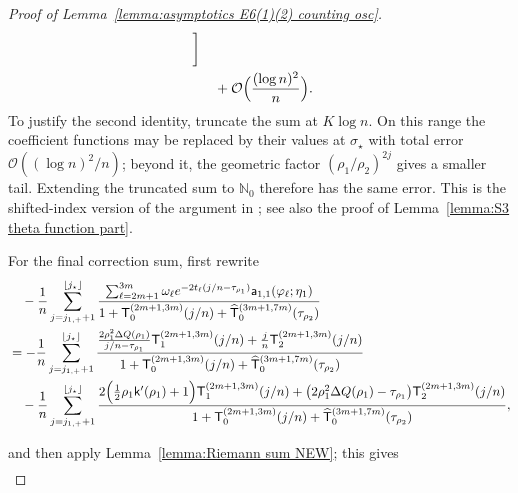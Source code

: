 \documentclass[a4paper]{article}
\numberwithin{equation}{section}
\begin{document}
\begin{proof}[Proof of Lemma~\ref{lemma:asymptotics E6(1)(2) counting osc}]
\begin{align*}
\bigg]
\\
&\quad 
+\mathcal{O}\Bigl(\frac{(\log n)^2}{n}\Bigr). 
\end{align*}
To justify the second identity, truncate the sum at $K\log n$.  On this range
the coefficient functions may be replaced by their values at $\sigma_\star$
with total error $\mathcal O((\log n)^2/n)$; beyond it, the geometric factor
$(\rho_1/\rho_2)^{2j}$ gives a smaller tail.  Extending the truncated sum to
$\mathbb N_0$ therefore has the same error.  This is the shifted-index version
of the argument in \cite{ACCL2}; see also the proof of
Lemma~\ref{lemma:S3 theta function part}.

For the final correction sum, first rewrite
\begin{align*}
&\quad 
-\frac{1}{n}
\sum_{j=j_{1,+}+1}^{\lfloor j_{\star}\rfloor}
\frac{
\sum_{\ell={2m+1}}^{3m}\omega_{\ell}
e^{-2t_{\ell}(j/n-\tau_{\rho_1})}
\mathsf{a}_{1,1}(\varphi_{\ell};\eta_1)
}{
1+\mathsf{T}_{0}^{(2m+1,3m)}(j/n)+\widehat{\mathsf{T}}_0^{(3m+1,7m)}(\tau_{\rho_2})}
\\
&=
-\frac{1}{n}
\sum_{j=j_{1,+}+1}^{\lfloor j_{\star}\rfloor}
\frac{\frac{2\rho_1^2\Delta Q(\rho_1)}{j/n-\tau_{\rho_1}}
\mathsf{T}_{1}^{(2m+1,3m)}(j/n)
+
\frac{j}{n}
\mathsf{T}_{2}^{(2m+1,3m)}(j/n)
}{
1+\mathsf{T}_{0}^{(2m+1,3m)}(j/n)+\widehat{\mathsf{T}}_0^{(3m+1,7m)}(\tau_{\rho_2})}
\\
&\quad 
-\frac{1}{n}
\sum_{j=j_{1,+}+1}^{\lfloor j_{\star}\rfloor}
\frac{2\Bigl(\frac{1}{2}\rho_1\mathsf{k}'(\rho_1)+1\Bigr)
\mathsf{T}_{1}^{(2m+1,3m)}(j/n)
+
\bigl(2\rho_1^2\Delta Q(\rho_1)-\tau_{\rho_1}\bigr)
\mathsf{T}_{2}^{(2m+1,3m)}(j/n)
}{
1+\mathsf{T}_{0}^{(2m+1,3m)}(j/n)+\widehat{\mathsf{T}}_0^{(3m+1,7m)}(\tau_{\rho_2})},
\end{align*}

and then apply Lemma~\ref{lemma:Riemann sum NEW}; this gives
\begin{align*}

\end{align*}
\end{proof}
\end{document}
